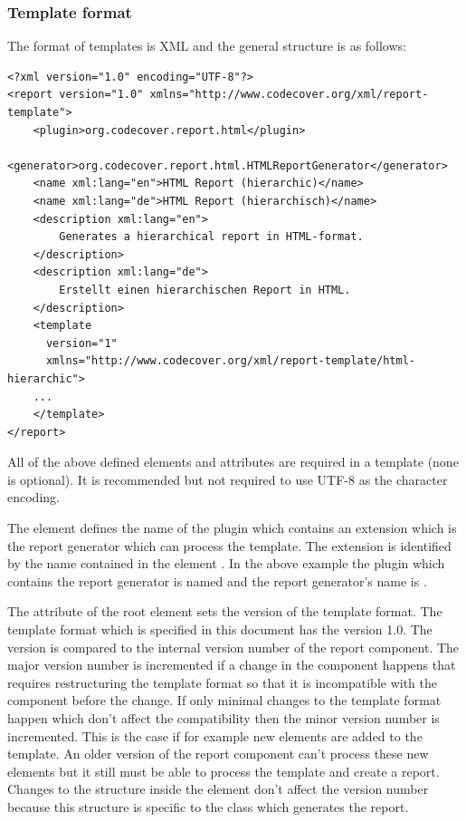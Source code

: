 \subsubsection{Template format} \label{Components:Report:Template}

The format of templates is XML and the general structure is as follows:
\begin{verbatim}
<?xml version="1.0" encoding="UTF-8"?>
<report version="1.0" xmlns="http://www.codecover.org/xml/report-template">
    <plugin>org.codecover.report.html</plugin>
    <generator>org.codecover.report.html.HTMLReportGenerator</generator>
    <name xml:lang="en">HTML Report (hierarchic)</name>
    <name xml:lang="de">HTML Report (hierarchisch)</name>
    <description xml:lang="en">
        Generates a hierarchical report in HTML-format.
    </description>
    <description xml:lang="de">
        Erstellt einen hierarchischen Report in HTML.
    </description>
    <template
      version="1"
      xmlns="http://www.codecover.org/xml/report-template/html-hierarchic">
    ...
    </template>
</report>
\end{verbatim}
All of the above defined elements and attributes are required in a template (none is optional). It is recommended but not required to use UTF-8 as the character encoding.

The element  defines the name of the plugin which contains an extension which is the report generator which can process the template. The extension is identified by the name contained in the element .
In the above example the plugin which contains the report generator is named  and the report generator's name is .

The attribute  of the root element  sets the version of the template format. The template format which is specified in this document has the version 1.0. The version is compared to the internal version number of the report component. The major version number is incremented if a change in the component happens that requires restructuring the template format so that it is incompatible with the component before the change. If only minimal changes to the template format happen which don't affect the compatibility then the minor version number is incremented. This is the case if for example new elements are added to the template. An older version of the report component can't process these new elements but it still must be able to process the template and create a report. Changes to the structure inside the  element don't affect the version number because this structure is specific to the class which generates the report.

